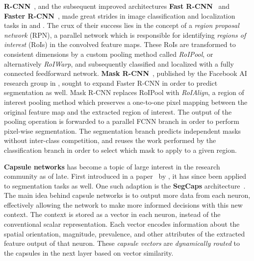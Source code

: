 \textbf{R-CNN}~\cite{r-cnn}, and the subsequent improved architectures \textbf{Fast R-CNN}~\cite{fast-r-cnn} and \textbf{Faster R-CNN}~\cite{faster-r-cnn}, made great strides in image classification and localization tasks in \citeyear{r-cnn} and \citeyear{faster-r-cnn}.
The crux of their success lies in the concept of a \textit{region proposal network} (RPN), a parallel network which is responsible for identifying \textit{regions of interest} (RoIs) in the convolved feature maps.
These RoIs are transformed to consistent dimensions by a custom pooling method called \textit{RoIPool}, or alternatively \textit{RoIWarp}, and subsequently classified and localized with a fully connected feedforward network.
\textbf{Mask R-CNN}~\cite{mask-r-cnn}, published by the Facebook AI research group in \citeyear{mask-r-cnn}, sought to expand Faster R-CNN in order to predict segmentation as well.
Mask R-CNN replaces RoIPool with \textit{RoIAlign}, a region of interest pooling method which preserves a one-to-one pixel mapping between the original feature map and the extracted region of interest.
The output of the pooling operation is forwarded to a parallel FCNN branch in order to perform pixel-wise segmentation.
The segmentation branch predicts independent masks without inter-class competition, and reuses the work performed by the classification branch in order to select which mask to apply to a given region.

\textbf{Capsule networks} has become a topic of large interest in the research community as of late.
First introduced in a paper~\cite{capsules} by \citeauthor{capsules}, it has since been applied to segmentation tasks as well.
One such adaption is the \textbf{SegCaps} architecture~\cite{segmentation-segcaps}.
The main idea behind capsule networks is to output more data from each neuron, effectively allowing the network to make more informed decisions with this new context.
The context is stored as a vector in each neuron, instead of the conventional scalar representation.
Each vector encodes information about the spatial orientation, magnitude, prevalence, and other attributes of the extracted feature output of that neuron.
These \textit{capsule vectors} are \textit{dynamically routed} to the capsules in the next layer based on vector similarity.
